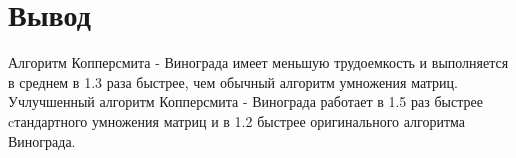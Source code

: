 \section*{Вывод}

Алгоритм Копперсмита - Винограда имеет меньшую трудоемкость и выполняется в среднем в 1.3 раза быстрее, чем обычный алгоритм умножения матриц. Учлучшенный алгоритм Копперсмита - Винограда работает в 1.5 раз быстрее cтандартного умножения матриц и в 1.2 быстрее оригинального алгоритма Винограда.